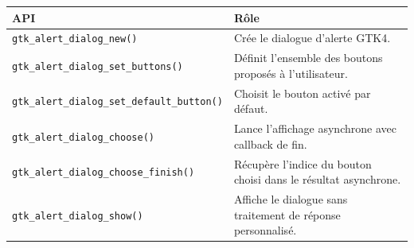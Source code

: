 \begin{center}
\begin{tabular}{|l|p{8cm}|}
\hline
\textbf{API} & \textbf{Rôle} \\
\hline
\texttt{gtk\_alert\_dialog\_new()} & Crée le dialogue d'alerte GTK4. \\
\hline
\texttt{gtk\_alert\_dialog\_set\_buttons()} & Définit l'ensemble des boutons proposés à l'utilisateur. \\
\hline
\texttt{gtk\_alert\_dialog\_set\_default\_button()} & Choisit le bouton activé par défaut. \\
\hline
\texttt{gtk\_alert\_dialog\_choose()} & Lance l'affichage asynchrone avec callback de fin. \\
\hline
\texttt{gtk\_alert\_dialog\_choose\_finish()} & Récupère l'indice du bouton choisi dans le résultat asynchrone. \\
\hline
\texttt{gtk\_alert\_dialog\_show()} & Affiche le dialogue sans traitement de réponse personnalisé. \\
\hline
\end{tabular}
\end{center}

\newpage
